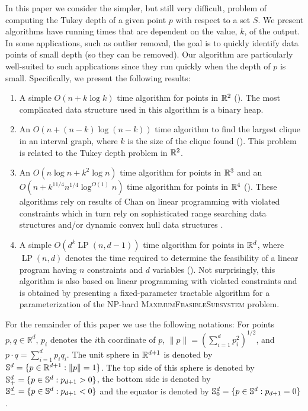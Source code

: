 \documentclass[charterfonts,lotsofwhite]{patmorin}
\DeclareMathOperator{\lp}{LP}
\begin{document}
In this paper we consider the simpler, but still very difficult,
problem of computing the Tukey depth of a given point $p$ with respect
to a set $S$.  We present algorithms have running times that are
dependent on the value, $k$, of the output.  In some applications,
such as outlier removal, the goal is to quickly identify data points
of small depth (so they can be removed).  Our algorithm are
particularly well-suited to such applications since they run quickly
when the depth of $p$ is small.  Specifically, we present the
following results:

\begin{enumerate}
\item A simple $O(n + k\log k)$ time algorithm for points in $\mathbb{R}^2$
().  The most complicated data structure used in this
algorithm is a binary heap.

\item An $O(n + (n-k)\log(n-k))$ time algorithm to find the largest
clique in an interval graph, where $k$ is the size of the clique found
().  This problem is related to the Tukey
depth problem in $\mathbb{R}^2$.

\item An $O(n\log n + k^2\log n)$ time algorithm for points in $\mathbb{R}^3$
and an $O(n + k^{11/4}n^{1/4}\log^{O(1)}n)$ time algorithm for points
in $\mathbb{R}^4$ ().  These algorithms rely on results of Chan
on linear programming with violated constraints \cite{c05} which in
turn rely on sophisticated range searching data structures
\cite{m92,r99} and/or dynamic convex hull data structures \cite{bj02}.

\item A simple $O(d^k \lp(n,d-1))$ time algorithm for points in
$\mathbb{R}^d$, where $\lp(n,d)$ denotes the time required to determine the
feasibility of a linear program having $n$ constraints and $d$
variables ().  Not surprisingly, this algorithm is also
based on linear programming with violated constraints and is obtained
by presenting a fixed-parameter tractable algorithm for a
parameterization of the NP-hard \textsc{MaximumFeasibleSubsystem}
problem.
\end{enumerate}

For the remainder of this paper we use the following notations: For
points $p,q\in\mathbb{R}^d$, $p_i$ denotes the $i$th coordinate of
$p$, $\|p\|=(\sum_{i=1}^d p_i^2)^{1/2}$, and $p\cdot
q=\sum_{i=1}^d p_iq_i$.  The unit sphere in $\mathbb{R}^{d+1}$ is denoted by
$\mathbb{S}^d =\{ p\in\mathbb{R}^{d+1} : \|p\|=1\}$. The top side of this sphere is
denoted by $\mathbb{S}^d_+ =\{ p\in\mathbb{S}^{d} : p_{d+1} > 0 \}$, the bottom
side is denoted by $\mathbb{S}^d_- =\{ p\in\mathbb{S}^{d} : p_{d+1} < 0 \}$ and the
equator is denoted by $\mathbb{S}^d_0 =\{ p\in\mathbb{S}^{d} : p_{d+1} = 0 \}$ .
\end{document}
